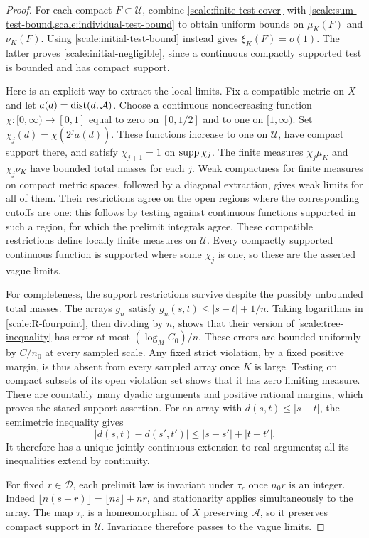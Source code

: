 \begin{proof}
For each compact $F\subset\mathcal U$, combine
\cref{scale:finite-test-cover} with
\cref{scale:sum-test-bound,scale:individual-test-bound} to obtain
uniform bounds on $\mu_K(F)$ and $\nu_K(F)$. Using
\cref{scale:initial-test-bound} instead gives $\xi_K(F)=o(1)$.
The latter proves \cref{scale:initial-negligible}, since a continuous
compactly supported test is bounded and has compact support.

Here is an explicit way to extract the local limits. Fix a compatible
metric on $X$ and let $a(d)=\operatorname{dist}(d,\mathcal A)$. Choose a continuous
nondecreasing function $\chi:[0,\infty)\to[0,1]$ equal to zero on
$[0,1/2]$ and to one on $[1,\infty)$. Set
$\chi_j(d)=\chi(2^j a(d))$. These functions increase to one on
$\mathcal U$, have compact support there, and satisfy
$\chi_{j+1}=1$ on $\operatorname{supp}\chi_j$. The finite measures
$\chi_j\mu_K$ and $\chi_j\nu_K$ have bounded total masses for
each $j$. Weak compactness for finite measures on compact metric
spaces, followed by a diagonal extraction, gives weak limits for
all of them. Their restrictions agree on the open regions where the
corresponding cutoffs are one: this follows by testing against
continuous functions supported in such a region, for which the
prelimit integrals agree. These compatible restrictions define
locally finite measures on $\mathcal U$. Every compactly supported
continuous function is supported where some $\chi_j$ is one, so
these are the asserted vague limits.

For completeness, the support restrictions survive despite the
possibly unbounded total masses. The arrays $g_n$ satisfy
$g_n(s,t)\le|s-t|+1/n$. Taking logarithms in
\cref{scale:R-fourpoint}, then dividing by $n$, shows that their
version of \cref{scale:tree-inequality} has error at most
$(\log_M C_0)/n$. These errors are bounded uniformly by $C/n_0$
at every sampled scale. Any fixed strict violation, by a fixed
positive margin, is thus absent from every sampled array once $K$
is large. Testing on compact subsets of its open violation set
shows that it has zero limiting measure. There are countably many
dyadic arguments and positive rational margins, which proves the
stated support assertion. For an array with $d(s,t)\le|s-t|$,
the semimetric inequality gives
\[
 |d(s,t)-d(s',t')|\le|s-s'|+|t-t'|.
\]
It therefore has a unique jointly continuous extension to real
arguments; all its inequalities extend by continuity.

For fixed $r\in\mathcal D$, each prelimit law is invariant under
$\tau_r$ once $n_0r$ is an integer. Indeed
$\lfloor n(s+r)\rfloor=\lfloor ns\rfloor+nr$, and stationarity
applies simultaneously to the array. The map $\tau_r$ is a
homeomorphism of $X$ preserving $\mathcal A$, so it preserves
compact support in $\mathcal U$. Invariance therefore passes to
the vague limits.


\end{proof}
